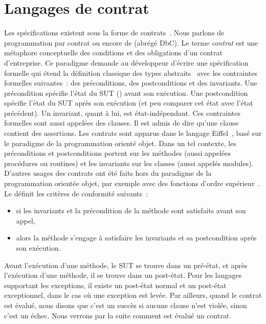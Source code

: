 \section{Langages de contrat}
\label{section:sota:bisl}

Les spécifications existent sous la forme de {\strong contrats}~. Nous parlons de programmation par contrat ou encore de
 (abrégé DbC). Le terme {\em contrat} est une
métaphore conceptuelle des conditions et des obligations d'un contrat
d'entreprise. Ce paradigme demande au développeur d'écrire une spécification
formelle qui étend la définition classique des types abstraits~
avec les contraintes formelles suivantes~: des {\strong préconditions}, des
{\strong postconditions} et des {\strong invariants}. Une précondition spécifie
l'état du SUT () avant son exécution. Une
postcondition spécifie l'état du SUT après son exécution (et peu comparer cet
état avec l'état précédent). Un invariant, quant à lui, est état-indépendant.
Ces contraintes formelles sont aussi appelées des {\strong clauses}. Il est
admis de dire qu'une clause contient des {\strong assertions}. Les contrats sont
apparus dans le langage Eiffel~, basé sur le paradigme de la
programmation orienté objet. Dans un tel contexte, les préconditions et
postconditions portent sur les méthodes (aussi appelées procédures ou routines)
et les invariants sur les classes (aussi appelés modules). D'autres usages des
contrats ont été faits hors du paradigme de la programmation orientée objet, par
exemple avec des fonctions d'ordre supérieur~. Le
 définit les critères de conformité suivants~:
%
\begin{itemize}

\item si les invariants et la précondition de la méthode sont satisfaits avant
son appel,

\item alors la méthode s'engage à satisfaire les invariants et sa postcondition
après son exécution.

\end{itemize}
%
Avant l'exécution d'une méthode, le SUT se trouve dans un {\strong pré-état}, et
après l'exécution d'une méthode, il se trouve dans un {\strong post-état}. Pour
les langages supportant les exceptions, il existe un post-état normal et un
post-état exceptionnel, dans le cas où une exception est levée. Par ailleurs,
quand le contrat est évalué, nous disons que c'est un {\strong succès} si aucune
clause n'est violée, sinon c'est un {\strong échec}. Nous verrons par la suite
comment est évalué un contrat.

